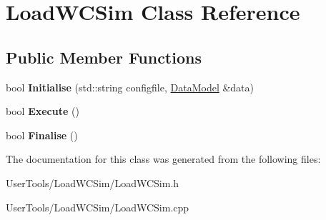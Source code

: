 \hypertarget{classLoadWCSim}{
\section{LoadWCSim Class Reference}
\label{classLoadWCSim}
}
\subsection*{Public Member Functions}
\begin{DoxyCompactItemize}
\item 
\hypertarget{classLoadWCSim_a14c9d0f26dc099128ca670bd48b7cd34}{
bool {\bfseries Initialise} (std::string configfile, \hyperlink{classDataModel}{DataModel} \&data)}
\label{classLoadWCSim_a14c9d0f26dc099128ca670bd48b7cd34}

\item 
\hypertarget{classLoadWCSim_ae8b696ec0cbd3c0febee1c3482df3f7b}{
bool {\bfseries Execute} ()}
\label{classLoadWCSim_ae8b696ec0cbd3c0febee1c3482df3f7b}

\item 
\hypertarget{classLoadWCSim_afa581b87ca4db35eeb17bab6f40d169f}{
bool {\bfseries Finalise} ()}
\label{classLoadWCSim_afa581b87ca4db35eeb17bab6f40d169f}

\end{DoxyCompactItemize}


The documentation for this class was generated from the following files:\begin{DoxyCompactItemize}
\item 
UserTools/LoadWCSim/LoadWCSim.h\item 
UserTools/LoadWCSim/LoadWCSim.cpp\end{DoxyCompactItemize}
